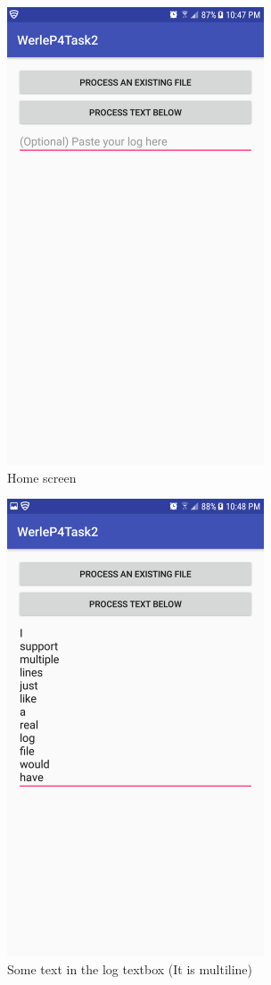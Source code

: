 \documentclass[11pt]{article}
\begin{document}
	\begin{figure}[ht]
		\includegraphics[width=3in]{img/t2s1.png}
		\centering
		\caption{Home screen}
	\end{figure}
	\begin{figure}[ht]
		\includegraphics[width=3in]{img/t2s2.png}
		\centering
		\caption{Some text in the log textbox (It is multiline)}
	\end{figure}
\end{document}
